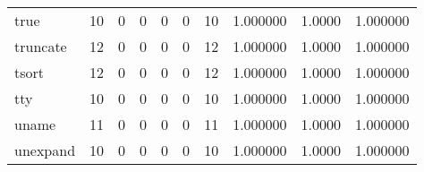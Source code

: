 \begin{longtable}{lrrrrrrrrr}
true      &                                       10 &                                                  0 &                                                  0 &                                                  0 &                                                  0 &                                                 10 &                                           1.000000 &                                 1.0000 &                             1.000000 \\
truncate  &                                       12 &                                                  0 &                                                  0 &                                                  0 &                                                  0 &                                                 12 &                                           1.000000 &                                 1.0000 &                             1.000000 \\
tsort     &                                       12 &                                                  0 &                                                  0 &                                                  0 &                                                  0 &                                                 12 &                                           1.000000 &                                 1.0000 &                             1.000000 \\
tty       &                                       10 &                                                  0 &                                                  0 &                                                  0 &                                                  0 &                                                 10 &                                           1.000000 &                                 1.0000 &                             1.000000 \\
uname     &                                       11 &                                                  0 &                                                  0 &                                                  0 &                                                  0 &                                                 11 &                                           1.000000 &                                 1.0000 &                             1.000000 \\
unexpand  &                                       10 &                                                  0 &                                                  0 &                                                  0 &                                                  0 &                                                 10 &                                           1.000000 &                                 1.0000 &                             1.000000 \\

\end{longtable}
